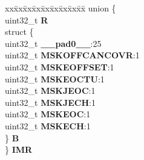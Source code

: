 \begin{DoxyCompactItemize}
\begin{tabbing}
\end{tabbing}\item 
\mbox{\label{structADC__tag_a2cea085bfda7ae755e304415483b41f0}} 
\begin{tabbing}
xx\=xx\=xx\=xx\=xx\=xx\=xx\=xx\=xx\=\kill
union \{\\
\>uint32\_t {\bfseries R}\\
\>struct \{\\
\>\>uint32\_t {\bfseries \_\_pad0\_\_}:25\\
\>\>uint32\_t {\bfseries MSKOFFCANCOVR}:1\\
\>\>uint32\_t {\bfseries MSKEOFFSET}:1\\
\>\>uint32\_t {\bfseries MSKEOCTU}:1\\
\>\>uint32\_t {\bfseries MSKJEOC}:1\\
\>\>uint32\_t {\bfseries MSKJECH}:1\\
\>\>uint32\_t {\bfseries MSKEOC}:1\\
\>\>uint32\_t {\bfseries MSKECH}:1\\
\>\} {\bfseries B}\\
\} {\bfseries IMR}\\


\end{tabbing}
\end{DoxyCompactItemize}
